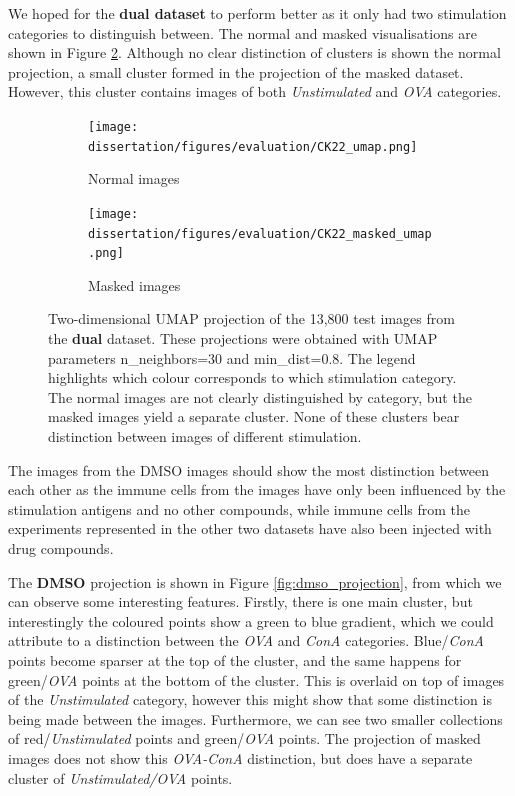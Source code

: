 We hoped for the \textbf{dual dataset} to perform better as it only had two stimulation categories to distinguish between. The normal and masked visualisations are shown in Figure \ref{fig:dual_visualisation}. Although no clear distinction of clusters is shown the normal projection, a small cluster formed in the projection of the masked dataset. However, this cluster contains images of both \textit{Unstimulated} and \textit{OVA} categories. 

\begin{figure}[ht!]
    \centering
    \begin{subfigure}[ht]{0.35\textwidth}
        \texttt{[image: dissertation/figures/evaluation/CK22\_umap.png]}
        \caption{Normal images}
    \end{subfigure}
    \begin{subfigure}[ht]{0.35\textwidth}
        \texttt{[image: dissertation/figures/evaluation/CK22\_masked\_umap.png]}
        \caption{Masked images}
        \label{subfig:dual_projection_masked}
    \end{subfigure}
    \caption{Two-dimensional UMAP projection of the 13,800 test images from the \textbf{dual} dataset. These projections were obtained with UMAP parameters n\_neighbors=30 and min\_dist=0.8. The legend highlights which colour corresponds to which stimulation category. The normal images are not clearly distinguished by category, but the masked images yield a separate cluster. None of these clusters bear distinction between images of different stimulation.}
    \label{fig:dual_visualisation}
\end{figure}

The images from the DMSO images should show the most distinction between each other as the immune cells from the images have only been influenced by the stimulation antigens and no other compounds, while immune cells from the experiments represented in the other two datasets have also been injected with drug compounds.

The \textbf{DMSO} projection is shown in Figure \ref{fig:dmso_projection}, from which we can observe some interesting features. Firstly, there is one main cluster, but interestingly the coloured points show a green to blue gradient, which we could attribute to a distinction between the \textit{OVA} and \textit{ConA} categories. Blue/\textit{ConA} points become sparser at the top of the cluster, and the same happens for green/\textit{OVA} points at the bottom of the cluster. This is overlaid on top of images of the \textit{Unstimulated} category, however this might show that some distinction is being made between the images. Furthermore, we can see two smaller collections of red/\textit{Unstimulated} points and green/\textit{OVA} points. The projection of masked images does not show this \textit{OVA-ConA} distinction, but does have a separate cluster of \textit{Unstimulated/OVA} points.

